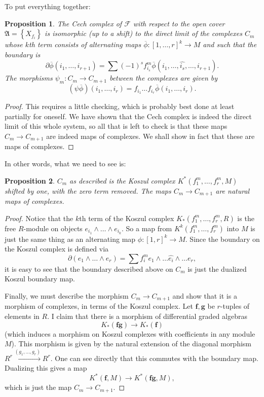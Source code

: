 \documentclass{article}
\newtheorem{proposition}{Proposition}
\begin{document}
To put everything together:
\begin{proposition} 
The Cech complex of $\mathcal{F}$ with respect to the open cover $\mathfrak{A}
= \left\{X_{f_i}\right\}$ is isomorphic (up to a shift) to the direct limit of the  complexes
$C_m$  whose $k$th term
consists of alternating maps $\overline{\phi}: [1, \dots, r]^k \to M$ and such
that the boundary is 
\[ \partial \overline{\phi}(i_1, \dots, i_{r+1} ) = \sum (-1)^s f_{i_s}^m 
\overline{\phi}(i_1, \dots, \hat{i_s}, \dots, i_{r+1}). \]
The morphisms $\psi_m: C_m \to C_{m+1}$ between the complexes are given by 
\[ (\psi \overline{\phi})(i_1, \dots, i_r) = f_{i_1}\dots f_{i_r}
\overline{\phi}(i_1, \dots, i_r).   \]
\end{proposition} 
\begin{proof} 
This requires a little checking, which is probably best done at least partially
for oneself. We have shown that the Cech complex is indeed the direct limit of
this whole system, so all that is left to check is that these maps $C_m \to
C_{m+1}$ are indeed maps of complexes. We shall show in fact that these are
maps of complexes.
\end{proof} 

In other words, what we need to see is:

\begin{proposition} 
$C_m$ as described is the Koszul complex $K^*( f_1^m, \dots, f_r^m,M)$ shifted by
one, with the zero term removed. The maps $C_m \to C_{m+1}$ are natural maps of complexes.
\end{proposition} 

\begin{proof} 
Notice that the $k$th term of the Koszul complex $K_*(f_1^m, \dots, f_r^m, R)$
is the free $R$-module on objects $e_{i_1} \wedge \dots \wedge e_{i_k}$. So a
map from $K^k(f_1^m, \dots, f_r^m)$ into $M$ is just the same thing as an alternating
map $\phi: [1, r]^k \to M$. Since the boundary on the Koszul complex
is defined via
\[ \partial (e_1 \wedge \dots \wedge e_r) = \sum f_i^m e_1 \wedge \dots
\hat{e_i} \wedge \dots e_r,   \]
it is easy to see that the boundary described above on $C_m$ is just the dualized Koszul
boundary map. 

Finally, we must describe the morphism $C_m \to C_{m+1}$  and show that it is a
morphism of complexes, in terms of the Koszul complex.
Let $\mathbf{f}, \mathbf{g}$ be $r$-tuples of elements in $R$. 
I claim that there is a morphism of differential graded algebras
\[ K_*(\mathbf{fg}) \to K_*(\mathbf{f})  \]
(which induces a morphism on Koszul complexes with coefficients in any module
$M$). This morphism is given
by the natural extension of the diagonal morphism $R^r \stackrel{(g_1, \dots,
g_r)}{\to} R^r$. One can see directly that this commutes with the boundary map.
Dualizing this gives a map
\[ K^*(\mathbf{f}, M) \to K^*(\mathbf{fg}, M),  \]
which is just the map $C_m \to C_{m+1}$.
\end{proof} 
\end{document}
